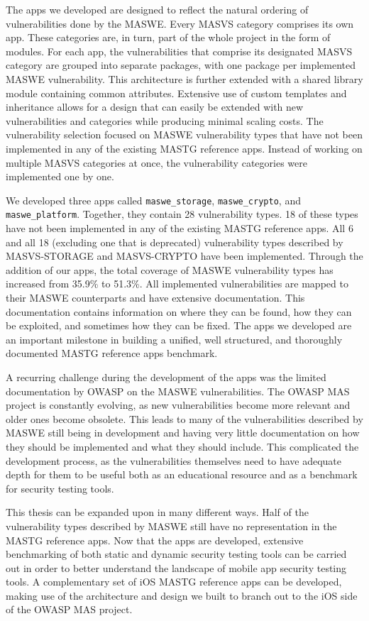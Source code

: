 The apps we developed are designed to reflect the natural ordering of vulnerabilities done by the MASWE. Every MASVS category comprises its own app. These categories are, in turn, part of the whole project in the form of modules. For each app, the vulnerabilities that comprise its designated MASVS category are grouped into separate packages, with one package per implemented MASWE vulnerability. This architecture is further extended with a shared library module containing common attributes. Extensive use of custom templates and inheritance allows for a design that can easily be extended with new vulnerabilities and categories while producing minimal scaling costs. The vulnerability selection focused on MASWE vulnerability types that have not been implemented in any of the existing MASTG reference apps. Instead of working on multiple MASVS categories at once, the vulnerability categories were implemented one by one.

We developed three apps called \texttt{maswe\_storage}, \texttt{maswe\_crypto}, and \texttt{maswe\_platform}. Together, they contain 28 vulnerability types. 18 of these types have not been implemented in any of the existing MASTG reference apps. All 6 and all 18 (excluding one that is deprecated) vulnerability types described by MASVS-STORAGE and MASVS-CRYPTO have been implemented. Through the addition of our apps, the total coverage of MASWE vulnerability types has increased from 35.9\% to 51.3\%. All implemented vulnerabilities are mapped to their MASWE counterparts and have extensive documentation. This documentation contains information on where they can be found, how they can be exploited, and sometimes how they can be fixed. The apps we developed are an important milestone in building a unified, well structured, and thoroughly documented MASTG reference apps benchmark.

A recurring challenge during the development of the apps was the limited documentation by OWASP on the MASWE vulnerabilities. The OWASP MAS project is constantly evolving, as new vulnerabilities become more relevant and older ones become obsolete. This leads to many of the vulnerabilities described by MASWE still being in development and having very little documentation on how they should be implemented and what they should include. This complicated the development process, as the vulnerabilities themselves need to have adequate depth for them to be useful both as an educational resource and as a benchmark for security testing tools.

This thesis can be expanded upon in many different ways. Half of the vulnerability types described by MASWE still have no representation in the MASTG reference apps. Now that the apps are developed, extensive benchmarking of both static and dynamic security testing tools can be carried out in order to better understand the landscape of mobile app security testing tools. A complementary set of iOS MASTG reference apps can be developed, making use of the architecture and design we built to branch out to the iOS side of the OWASP MAS project.

